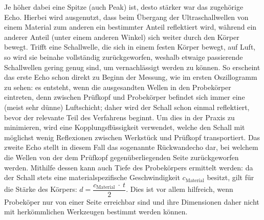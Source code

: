 \documentclass[a4paper, 10pt]{scrartcl}
\begin{document}
Je höher dabei eine Spitze (auch Peak) ist, desto stärker war das zugehörige Echo. Hierbei wird ausgenutzt, dass beim Übergang der Ultraschallwellen von einem Material zum anderen ein bestimmter Anteil reflektiert wird, während ein anderer Anteil (unter einem anderen Winkel) sich weiter durch den Körper bewegt. Trifft eine Schallwelle, die sich in einem festen Körper bewegt, auf Luft, so wird sie beinahe vollständig zurückgeworfen, weshalb etwaige passierende Schallwellen gering genug sind, um vernachlässigt werden zu können. So erscheint das erste Echo schon direkt zu Beginn der Messung, wie im ersten Oszillogramm zu sehen: es entsteht, wenn die ausgesandten Wellen in den Probekörper eintreten, denn zwischen Prüfkopf und Probekörper befindet sich immer eine (meist sehr dünne) Luftschicht; daher wird der Schall schon einmal reflektiert, bevor der relevante Teil des Verfahrens beginnt. Um dies in der Praxis zu minimieren, wird eine Kopplungsflüssigkeit verwendet, welche den Schall mit möglichst wenig Reflexionen zwischen Werkstück und Prüfkopf transportiert. Das zweite Echo stellt in diesem Fall das sogenannte Rückwandecho dar, bei welchem die Wellen von der dem Prüfkopf gegenüberliegenden Seite zurückgeworfen werden. Mithilfe dessen kann auch Tiefe des Probekörpers ermittelt werden: da der Schall stets eine materialspezifische Geschwindigkeit $c_\mathrm{Material}$ \cite{schallgeschwindigkeiten} besitzt, gilt für die Stärke des Körpers: $d = \dfrac{c_\mathrm{Material}~\cdot~t}{2}$. Dies ist vor allem hilfreich, wenn Probeköper nur von einer Seite erreichbar sind und ihre Dimensionen daher nicht mit herkömmlichen Werkzeugen bestimmt werden können.\\
\end{document}
